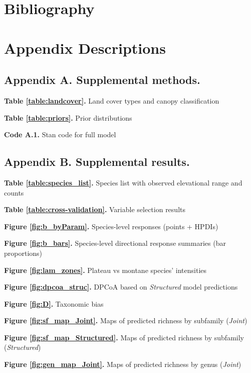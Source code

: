 \documentclass[preprint,final,times,12pt,3p]{elsarticle}
\begin{document}
\newpage
\section{Bibliography}




\newpage
\section{Appendix Descriptions}

\subsection{Appendix A. Supplemental methods.}

\textbf{Table \ref{table:landcover}.} Land cover types and canopy classification

\textbf{Table \ref{table:priors}.} Prior distributions

\textbf{Code A.1.} Stan code for full model



\subsection{Appendix B. Supplemental results.}

\textbf{Table \ref{table:species_list}.} Species list with observed elevational range and counts

\textbf{Table \ref{table:cross-validation}.} Variable selection results

\textbf{Figure \ref{fig:b_byParam}.} Species-level responses (points + HPDIs)

\textbf{Figure \ref{fig:b_bars}.} Species-level directional response summaries (bar proportions)

\textbf{Figure \ref{fig:lam_zones}.} Plateau vs montane species' intensities

\textbf{Figure \ref{fig:dpcoa_struc}.} DPCoA based on \emph{Structured} model predictions

\textbf{Figure \ref{fig:D}.} Taxonomic bias

\textbf{Figure \ref{fig:sf_map_Joint}.} Maps of predicted richness by subfamily (\emph{Joint})

\textbf{Figure \ref{fig:sf_map_Structured}.} Maps of predicted richness by subfamily (\emph{Structured})

\textbf{Figure \ref{fig:gen_map_Joint}.} Maps of predicted richness by genus (\emph{Joint})
\end{document}
